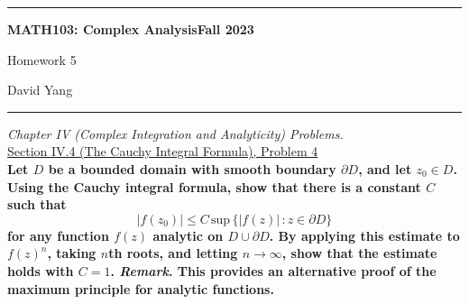 \documentclass[11pt]{article}
\theoremstyle{definition}
\begin{document}
	\hrule
	\begin{center}
        \textbf{MATH103: Complex Analysis}\hfill \textbf{Fall 2023}\newline


		{\Large Homework 5}

		David Yang
	\end{center}

\hrule

\vspace{1em}


\textit{Chapter IV (Complex Integration and Analyticity) Problems.} \\

\underline{Section IV.4 (The Cauchy Integral Formula), Problem 4} \\

\textbf{Let $D$ be a bounded domain with smooth boundary $\partial D$, and let $z_0 \in D$. Using the Cauchy integral formula, show that there is a constant $C$ such that}
\[ |f(z_0)| \leq C \, \mathrm{sup} \, \{|f(z)| \, : z \in \partial D\}\]
\textbf{for any function $f(z)$ analytic on $D \cup \partial D$. By applying this estimate to $f(z)^n$, taking $n$th roots, and letting $n \rightarrow \infty$, show that the estimate holds
with $C=1$. \textit{Remark}. This provides an alternative proof of the maximum principle for analytic functions.}
\end{document}
